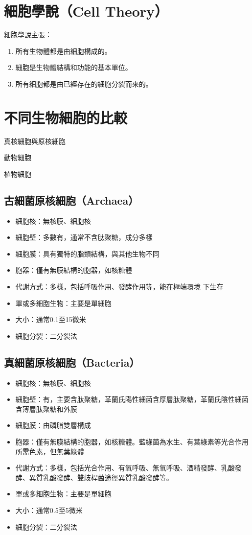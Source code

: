 \documentclass[a4paper,12pt]{report}
\begin{document}
\section{細胞學說（Cell Theory）}
細胞學說主張：
\begin{enumerate}
\item 所有生物體都是由細胞構成的。
\item 細胞是生物體結構和功能的基本單位。
\item 所有細胞都是由已經存在的細胞分裂而來的。
\end{enumerate}
\section{不同生物細胞的比較}
\bct\bfH\ctr{}\caption{真核細胞與原核細胞}\ef\FB\ect
\bct\bfH\ctr{}\caption{動物細胞}\ef\FB\ect
\bct\bfH\ctr{}\caption{植物細胞}\ef\FB\ect
\subsection{古細菌原核細胞（Archaea）}
\begin{itemize}
  \item 細胞核：無核膜、細胞核
  \item 細胞壁：多數有，通常不含肽聚糖，成分多樣
  \item 細胞膜：具有獨特的脂類結構，與其他生物不同
  \item 胞器：僅有無膜結構的胞器，如核糖體
  \item 代謝方式：多樣，包括呼吸作用、發酵作用等，能在極端環境 下生存
  \item 單或多細胞生物：主要是單細胞
  \item 大小：通常0.1至15微米
  \item 細胞分裂：二分裂法
\end{itemize}
\subsection{真細菌原核細胞（Bacteria）}
\begin{itemize}
  \item 細胞核：無核膜、細胞核
  \item 細胞壁：有，主要含肽聚糖，革蘭氏陽性細菌含厚層肽聚糖，革蘭氏陰性細菌含薄層肽聚糖和外膜
  \item 細胞膜：由磷脂雙層構成
  \item 胞器：僅有無膜結構的胞器，如核糖體。藍綠菌為水生、有葉綠素等光合作用所需色素，但無葉綠體
  \item 代謝方式：多樣，包括光合作用、有氧呼吸、無氧呼吸、酒精發酵、乳酸發酵、異質乳酸發酵、雙歧桿菌途徑異質乳酸發酵等。
  \item 單或多細胞生物：主要是單細胞
  \item 大小：通常0.5至5微米
  \item 細胞分裂：二分裂法
\end{itemize}
\end{document}
